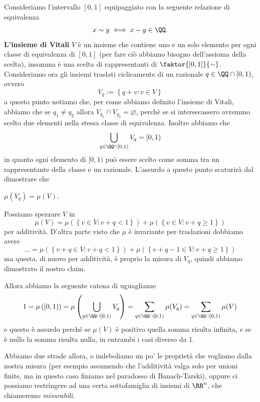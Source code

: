 \documentclass[11pt]{scrartcl}
\newcommand{\eset}{\varnothing}
\begin{document}
	\begin{example}[Vitali]
		Consideriamo l'intervallo $[0,1]$ equipaggiato con la seguente relazione di equivalenza
		$$x\sim y \iff x-y\in\QQ.$$
		\textbf{L'insieme di Vitali} $V$ è un insieme che contiene uno e un solo elemento per ogni classe di equivalenza di $[0,1]$ (per fare ciò abbiamo bisogno dell'assioma della scelta), insomma è una scelta di rappresentanti di $\faktor{[0,1]}{\sim}$. \\
		Consideriamo ora gli insiemi traslati ciclicamente di un razionale $q\in \QQ\cap [0,1)$, ovvero
		$$V_q:=\left\{q+v:v\in V\right\}$$
		a questo punto notiamo che, per come abbiamo definito l'insieme di Vitali, abbiamo che se $q_1\ne q_2$ allora $V_{q_1}\cap V_{q_2}=\eset$, perchè se si intersecassero avremmo scelto due elementi nella stessa classe di equivalenza. Inoltre abbiamo che
		$$\bigcup_{q\in \QQ\cap [0,1)}V_q=[0,1)$$
		in quanto ogni elemento di $[0,1)$ può essere scelto come somma tra un rappresentante della classe e un razionale. L'assurdo a questo punto scaturirà dal dimostrare che
		\begin{claim}
			$\mu(V_q)=\mu(V).$
		\end{claim}
		\begin{subproof}[Dimostrazione]
			Possiamo spezzare $V$ in 
			$$\mu(V)=\mu\left(\left\{v\in V:v+q<1\right\}\right)+\mu\left(\left\{v\in V:v+q\ge 1\right\}\right)$$
			per additività. D'altra parte visto che $\mu$ è invariante per traslazioni dobbiamo avere
			$$\dots= \mu\left(\left\{v+q\in V:v+q<1\right\}\right)+\mu\left(\left\{v+q-1\in V:v+q\ge 1\right\}\right)$$
			ma questa, di nuovo per additività, è proprio la misura di $V_q$, quindi abbiamo dimostrato il nostro claim.
		\end{subproof}
		Allora abbiamo la seguente catena di uguaglianze
		$$1=\mu\left([0,1)\right)=\mu\left(\bigcup_{q\in \QQ\cap [0,1)}V_q\right)=\sum_{q\in \QQ\cap [0,1)}\mu(V_q)=\sum_{q\in \QQ\cap [0,1)}\mu(V)$$
		e questo è assurdo perché se $\mu(V)$ è positivo quella somma risulta infinita, e se è nullo la somma risulta nulla, in entrambi i casi diverso da $1$.
	\end{example}
	Abbiamo due strade allora, o indeboliamo un po' le proprietà che vogliamo dalla nostra misura (per esempio assumendo che l'additività valga solo per unioni finite, ma in questo caso finiamo nel paradosso di Banach-Tarski), oppure ci possiamo restringere ad una certa sottofamiglia di insiemi di $\RR^n$, che chiameremo \textit{misurabili}. \\
\end{document}
